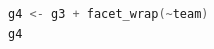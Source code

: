 \begin{lstlisting}[language=c++,label={code:05_13},caption={Divided by team}]
g4 <- g3 + facet_wrap(~team)
g4
\end{lstlisting}
